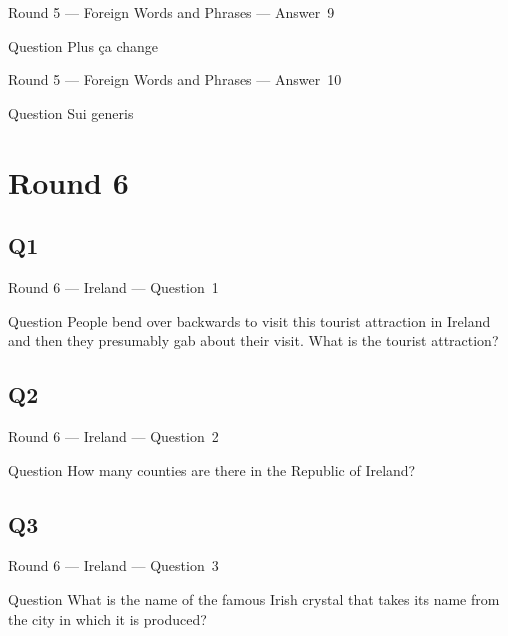 \documentclass[11pt]{beamer}
\begin{document}
\begin{frame}[t]{Round 5 --- Foreign Words and Phrases --- \mbox{Answer 9}}
    \vspace{-0.5em}
    \begin{block}{Question}
        Plus ça change
    \end{block}
\end{frame}
\begin{frame}[t]{Round 5 --- Foreign Words and Phrases --- \mbox{Answer 10}}
    \vspace{-0.5em}
    \begin{block}{Question}
        Sui generis
    \end{block}
\end{frame}
\def\thisSectionName{Ireland}
\section{Round 6}
\subsection*{Q1}
\begin{frame}[t]{Round 6 --- Ireland --- \mbox{Question 1}}
    \vspace{-0.5em}
    \begin{block}{Question}
        People bend over backwards to visit this tourist attraction in Ireland and then they presumably gab about their visit. What is the tourist attraction?
    \end{block}
\end{frame}
\subsection*{Q2}
\begin{frame}[t]{Round 6 --- Ireland --- \mbox{Question 2}}
    \vspace{-0.5em}
    \begin{block}{Question}
        How many counties are there in the Republic of Ireland?
    \end{block}
\end{frame}
\subsection*{Q3}
\begin{frame}[t]{Round 6 --- Ireland --- \mbox{Question 3}}
    \vspace{-0.5em}
    \begin{block}{Question}
        What is the name of the famous Irish crystal that takes its name from the city in which it is produced?
    \end{block}
\end{frame}
\end{document}
